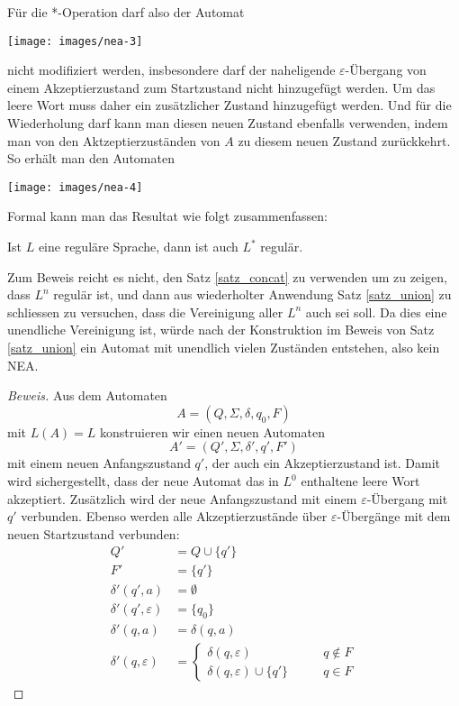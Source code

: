 Für die *-Operation darf also der Automat
\begin{center}
\texttt{[image: images/nea-3]}
\end{center}
nicht modifiziert werden, insbesondere darf der naheligende
$\varepsilon$-Übergang von einem Akzeptierzustand zum Startzustand
nicht hinzugefügt werden.
Um das leere Wort muss daher ein zusätzlicher Zustand hinzugefügt werden.
Und für die Wiederholung darf kann man diesen neuen Zustand ebenfalls
verwenden, indem man von den Aktzeptierzuständen von $A$ zu diesem
neuen Zustand zurückkehrt.
So erhält man den Automaten
\begin{center}
\texttt{[image: images/nea-4]}
\end{center}

Formal kann man das Resultat wie folgt zusammenfassen:
\begin{satz}
\label{satz_star}
Ist $L$ eine reguläre Sprache, dann ist auch $L^*$ regulär.
\end{satz}

Zum Beweis reicht es nicht, den Satz \ref{satz_concat} zu verwenden
um zu zeigen, dass $L^n$ regulär ist, und dann aus wiederholter
Anwendung Satz \ref{satz_union} zu schliessen zu versuchen,
dass die Vereinigung aller $L^n$ auch sei soll.
Da dies eine unendliche
Vereinigung ist, würde nach der Konstruktion im Beweis von Satz
\ref{satz_union} ein Automat mit unendlich vielen
Zuständen entstehen, also kein NEA.

\begin{proof}[Beweis]
Aus dem Automaten
\[
A=(Q,\Sigma, \delta,q_0,F)
\]
mit $L(A)=L$ konstruieren wir einen neuen
Automaten
\[
A'=(Q',\Sigma,\delta',q',F')
\]
mit einem neuen Anfangszustand $q'$, der auch
ein Akzeptierzustand ist.
Damit wird sichergestellt, dass der neue Automat das in $L^0$
enthaltene leere Wort akzeptiert.
Zusätzlich wird der neue Anfangszustand mit einem $\varepsilon$-Übergang
mit $q'$ verbunden.
Ebenso werden alle Akzeptierzustände über $\varepsilon$-Übergänge
mit dem neuen Startzustand verbunden:
\begin{align*}
Q'&=Q\cup \{q'\}\\
F'&=\{q'\}\\
\delta'(q',a)&=\emptyset\\
\delta'(q',\varepsilon)&= \{q_0\}\\
\delta'(q,a)&= \delta(q,a)\\
\delta'(q,\varepsilon)&=\begin{cases}
\delta(q,\varepsilon)          &\qquad q\not\in F\\
\delta(q,\varepsilon)\cup\{q'\}&\qquad q\in F
\end{cases}
\end{align*}
\end{proof}
